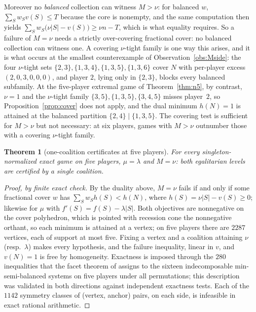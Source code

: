 \documentclass[11pt]{article}
\newtheorem{theorem}{Theorem}
\begin{document}
Moreover no \emph{balanced} collection can witness $M>\nu$: for balanced $w$,
$\sum_Sw_Sv(S)\le T$ because the core is nonempty, and the same computation
then yields $\sum_Sw_S\bigl(\nu|S|-v(S)\bigr)\ge\nu n-T$, which is what
equality requires.  So a failure of $M=\nu$ needs a strictly over-covering
fractional cover: no balanced collection can witness one.  A covering
$\nu$-tight family is one way this arises, and it is what occurs at the
smallest counterexample of Observation~\ref{obs:Mside}: the four $\nu$-tight sets $\{2,3\},\{1,3,4\},\{1,3,5\},
\{1,3,6\}$ cover $N$ with per-player excess $(2,0,3,0,0,0)$, and player $2$,
lying only in $\{2,3\}$, blocks every balanced subfamily.  At the
five-player extremal game of Theorem~\ref{thm:n5}, by contrast, $\nu=1$
and the $\nu$-tight family $\{3,5\},\{1,3,5\},\{3,4,5\}$ misses
player~$2$, so Proposition~\ref{prop:cover} does not apply, and the dual
minimum $h(N)=1$ is attained at the balanced partition
$\{2,4\}\mid\{1,3,5\}$.  The covering test is sufficient for $M>\nu$
but not necessary: at six players, games with $M>\nu$ outnumber those with
a covering $\nu$-tight family.

\begin{theorem}[one-coalition certificates at five players]
\label{thm:n5closed}
For every singleton-normalized exact game on five players, $\mu=\lambda$ and
$M=\nu$: both egalitarian levels are certified by a single coalition.
\end{theorem}

\begin{proof}[Proof, by finite exact check]
By the duality above, $M=\nu$ fails if and only if some fractional cover $w$
has $\sum_Sw_Sh(S)<h(N)$, where $h(S)=\nu|S|-v(S)\ge0$; likewise for
$\mu$ with $f'(S)=f(S)-\lambda|S|$.  Both objectives are nonnegative on the
cover polyhedron, which is pointed with recession cone the nonnegative
orthant, so each minimum is attained at a vertex; on five players there are
$2287$ vertices, each of support at most five.  Fixing a vertex and a
coalition attaining $\nu$ (resp.\ $\lambda$) makes every hypothesis, and
the failure inequality, linear in $v$, and $v(N)=1$ is free by homogeneity.
Exactness is imposed through the $280$ inequalities that the facet theorem of
\citet{StudenyKratochvil2022} assigns to the sixteen indecomposable
min-semi-balanced systems on five players under all permutations; this
description was validated in both directions against independent exactness
tests.  Each of the $1142$ symmetry classes of (vertex, anchor) pairs, on
each side, is infeasible in exact rational arithmetic.
\end{proof}
\end{document}
